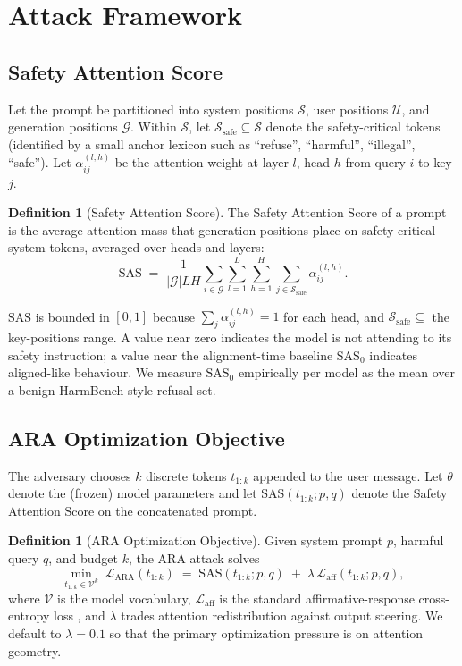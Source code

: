 \documentclass{article}
\theoremstyle{definition}
\newtheorem{definition}[theorem]{Definition}
\theoremstyle{remark}
\newcommand{\SAS}{\mathrm{SAS}}
\begin{document}
\section{Attack Framework}
\label{sec:attack}

\subsection{Safety Attention Score}

Let the prompt be partitioned into system positions $\mathcal{S}$, user positions $\mathcal{U}$, and generation positions $\mathcal{G}$. Within $\mathcal{S}$, let $\mathcal{S}_{\text{safe}} \subseteq \mathcal{S}$ denote the safety-critical tokens (identified by a small anchor lexicon such as ``refuse'', ``harmful'', ``illegal'', ``safe''). Let $\alpha^{(l,h)}_{ij}$ be the attention weight at layer $l$, head $h$ from query $i$ to key $j$.

\begin{definition}[Safety Attention Score]
\label{def:sas}
The Safety Attention Score of a prompt is the average attention mass that generation positions place on safety-critical system tokens, averaged over heads and layers:
\[
\SAS \;=\; \frac{1}{|\mathcal{G}| L H} \sum_{i \in \mathcal{G}} \sum_{l=1}^{L} \sum_{h=1}^{H} \sum_{j \in \mathcal{S}_{\text{safe}}} \alpha^{(l,h)}_{ij}.
\]
\end{definition}

SAS is bounded in $[0,1]$ because $\sum_j \alpha^{(l,h)}_{ij} = 1$ for each head, and $\mathcal{S}_{\text{safe}} \subseteq$ the key-positions range. A value near zero indicates the model is not attending to its safety instruction; a value near the alignment-time baseline $\SAS_0$ indicates aligned-like behaviour. We measure $\SAS_0$ empirically per model as the mean over a benign HarmBench-style refusal set.

\subsection{ARA Optimization Objective}

The adversary chooses $k$ discrete tokens $t_{1{:}k}$ appended to the user message. Let $\theta$ denote the (frozen) model parameters and let $\SAS(t_{1:k}; p, q)$ denote the Safety Attention Score on the concatenated prompt.

\begin{definition}[ARA Optimization Objective]
\label{def:ara}
Given system prompt $p$, harmful query $q$, and budget $k$, the ARA attack solves
\begin{equation}
\min_{t_{1:k} \in \mathcal{V}^{k}} \; \mathcal{L}_{\mathrm{ARA}}(t_{1:k}) \;=\; \SAS(t_{1:k}; p, q) \;+\; \lambda \, \mathcal{L}_{\mathrm{aff}}(t_{1:k}; p, q),
\label{eq:ara_obj}
\end{equation}
where $\mathcal{V}$ is the model vocabulary, $\mathcal{L}_{\mathrm{aff}}$ is the standard affirmative-response cross-entropy loss \cite{zou2023universal}, and $\lambda$ trades attention redistribution against output steering. We default to $\lambda = 0.1$ so that the primary optimization pressure is on attention geometry.
\end{definition}
\end{document}
